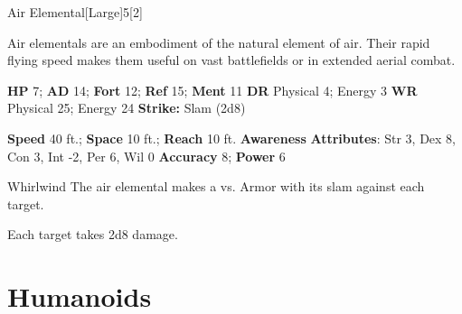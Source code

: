   \begin{monsection}{Air Elemental}[Large]{5}[2]
    \vspace{-1em}\vspace{-1em}
    \vspace{0em}

    
    Air elementals are an embodiment of the natural element of air.
    Their rapid flying speed makes them useful on vast battlefields or in extended aerial combat.
  

    \begin{spellcontent}
      \begin{spelltargetinginfo}
        \pari \textbf{HP} 7;
          \textbf{AD} 14;
          \textbf{Fort} 12;
          \textbf{Ref} 15;
          \textbf{Ment} 11
        \pari \textbf{DR} Physical 4; Energy 3
        \pari \textbf{WR} Physical 25; Energy 24
        \pari \textbf{Strike:}
            Slam  (2d8)
      \end{spelltargetinginfo}
    \end{spellcontent}
    \begin{monsterfooter}
      \pari \textbf{Speed} 40 ft.;
        \textbf{Space} 10 ft.;
        \textbf{Reach} 10 ft.
      \pari \textbf{Awareness} 
      \pari \textbf{Attributes}:
        Str 3, Dex 8,
        Con 3, Int -2,
        Per 6, Wil 0
      \pari \textbf{Accuracy} 8;
        \textbf{Power} 6
    \end{monsterfooter}
  \end{monsection}
  \begin{freeability}{Whirlwind}
      The air elemental makes a 
         vs. Armor
        with its slam against each target.
    
    \hit Each target takes 2d8  damage.
    \end{freeability}
  
        \section{Humanoids}
      
